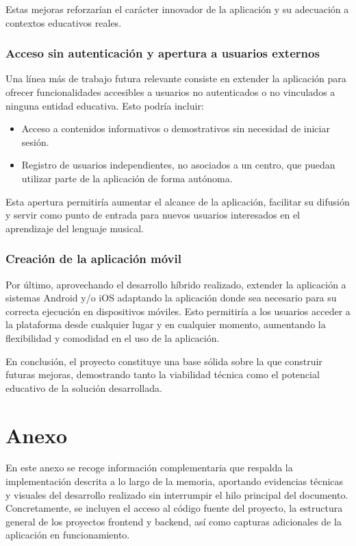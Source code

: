 Estas mejoras reforzarían el carácter innovador de la aplicación y su adecuación a contextos educativos reales.

\subsection{Acceso sin autenticación y apertura a usuarios externos}

Una línea más de trabajo futura relevante consiste en extender la aplicación para ofrecer funcionalidades accesibles a usuarios no autenticados o no vinculados a ninguna entidad educativa. Esto podría incluir:

\begin{itemize}
    \item Acceso a contenidos informativos o demostrativos sin necesidad de iniciar sesión.
    \item Registro de usuarios independientes, no asociados a un centro, que puedan utilizar parte de la aplicación de forma autónoma.
\end{itemize}

Esta apertura permitiría aumentar el alcance de la aplicación, facilitar su difusión y servir como punto de entrada para nuevos usuarios interesados en el aprendizaje del lenguaje musical.

\subsection{Creación de la aplicación móvil}
Por último, aprovechando el desarrollo híbrido realizado, extender la aplicación a sistemas Android y/o iOS adaptando la aplicación donde sea necesario para su correcta ejecución en dispositivos móviles. Esto permitiría a los usuarios acceder a la plataforma desde cualquier lugar y en cualquier momento, aumentando la flexibilidad y comodidad en el uso de la aplicación.

En conclusión, el proyecto constituye una base sólida sobre la que construir futuras mejoras, demostrando tanto la viabilidad técnica como el potencial educativo de la solución desarrollada.
\chapter{Anexo}
\label{chap:anexo}

En este anexo se recoge información complementaria que respalda la implementación descrita a lo largo de la memoria, aportando evidencias técnicas y visuales del desarrollo realizado sin interrumpir el hilo principal del documento. Concretamente, se incluyen el acceso al código fuente del proyecto, la estructura general de los proyectos frontend y backend, así como capturas adicionales de la aplicación en funcionamiento.

